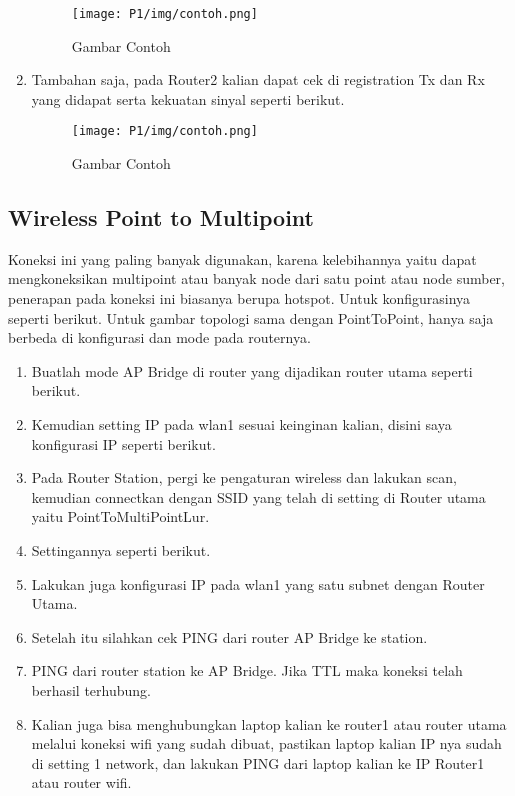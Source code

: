 \begin{center}
\begin{enumerate}
		\begin{figure}[H]
			\centering
			\texttt{[image: P1/img/contoh.png]}
			\caption{Gambar Contoh}
			\label{fig:gambarcontoh}
		\end{figure}
		\item Tambahan saja, pada Router2 kalian dapat cek di registration Tx dan Rx yang didapat serta kekuatan sinyal seperti berikut.
		\begin{figure}[H]
			\centering
			\texttt{[image: P1/img/contoh.png]}
			\caption{Gambar Contoh}
			\label{fig:gambarcontoh}
		\end{figure}
	\end{enumerate}
\end{center}

\subsection{Wireless Point to Multipoint}
Koneksi ini yang paling banyak digunakan, karena kelebihannya yaitu dapat mengkoneksikan
multipoint atau banyak node dari satu point atau node sumber, penerapan pada koneksi ini
biasanya berupa hotspot. Untuk konfigurasinya seperti berikut.
Untuk gambar topologi sama dengan PointToPoint, hanya saja berbeda di konfigurasi dan
mode pada routernya.
\begin{center}
	\begin{enumerate}
		\item Buatlah mode AP Bridge di router yang dijadikan router utama seperti berikut.
		\item Kemudian setting IP pada wlan1 sesuai keinginan kalian, disini saya konfigurasi IP seperti berikut.
		\item Pada Router Station, pergi ke pengaturan wireless dan lakukan scan, kemudian connectkan dengan SSID yang telah di setting di Router utama yaitu PointToMultiPointLur.
		\item Settingannya seperti berikut.
		\item Lakukan juga konfigurasi IP pada wlan1 yang satu subnet dengan Router Utama.
		\item Setelah itu silahkan cek PING dari router AP Bridge ke station.
		\item PING dari router station ke AP Bridge. Jika TTL maka koneksi telah berhasil terhubung.
		\item Kalian juga bisa menghubungkan laptop kalian ke router1 atau router utama melalui koneksi wifi yang sudah dibuat, pastikan laptop kalian IP nya sudah di setting 1 network, dan lakukan PING dari laptop kalian ke IP Router1 atau router wifi.
	\end{enumerate}
\end{center}

